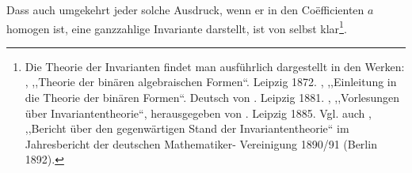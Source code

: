 
Dass auch umgekehrt jeder solche Ausdruck, wenn er in
den Co\"efficienten $a$ homogen ist, eine ganzzahlige Invariante
darstellt, ist von selbst klar\footnote{Die Theorie der Invarianten findet man ausf\"uhrlich dargestellt in
den Werken: , ,,Theorie der bin\"aren algebraischen Formen``.
Leipzig 1872. , ,,Einleitung in die Theorie der bin\"aren
Formen``. Deutsch von . Leipzig 1881. , ,,Vorlesungen
\"uber Invariantentheorie``, herausgegeben von . Leipzig
1885. Vgl. auch , ,,Bericht \"uber den gegenw\"artigen Stand
der Invariantentheorie`` im Jahresbericht der deutschen Mathematiker-
Vereinigung 1890/91 (Berlin 1892).}.

